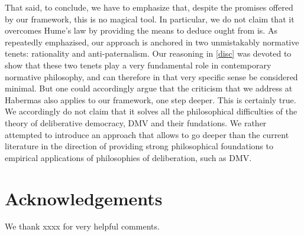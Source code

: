 \documentclass[version=3.21, pagesize, twoside=off, bibliography=totoc, DIV=calc, fontsize=12pt, a4paper, french, english]{scrartcl}
\newenvironment{acknowledgements}{
	\section*{Acknowledgements}
}{
}
\begin{document}
That said, to conclude, we have to emphasize that, despite the promises offered by our framework, this is no magical tool. 
In particular, we do not claim that it overcomes Hume's law by providing the means to deduce ought from is. 
As repeatedly emphazised, our approach is anchored in two unmistakably normative tenets: rationality and anti-paternalism. 
Our reasoning in \cref{disc} was devoted to show that these two tenets play a very fundamental role in contemporary normative philosophy, and can therefore in that very specific sense be considered minimal. 
But one could accordingly argue that the criticism that we address at Habermas also applies to our framework, one step deeper. This is certainly true. 
We accordingly do not claim that it solves all the philosophical difficulties of the theory of deliberative democracy, DMV and their fundations. 
We rather attempted to introduce an approach that allows to go deeper than the current literature in the direction of providing strong philosophical foundations to empirical applications of philosophies of deliberation, such as DMV. 


\begin{acknowledgements}
We thank xxxx for very helpful comments.
\end{acknowledgements}



\end{document}
